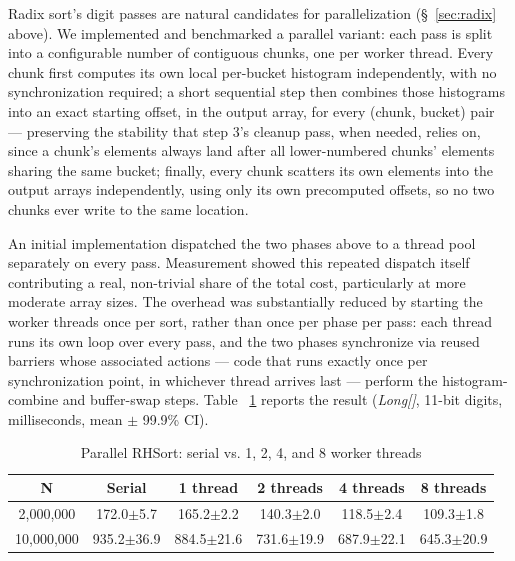 \documentclass[twoside,leqno,twocolumn]{article}
\begin{document}
Radix sort's digit passes are natural candidates for parallelization (\S~\ref{sec:radix} above).
We implemented and benchmarked a parallel variant:
each pass is split into a configurable number of contiguous chunks, one per worker thread.
Every chunk first computes its own local per-bucket histogram independently, with no synchronization required;
a short sequential step then combines those histograms into an exact starting offset, in the output array,
for every (chunk, bucket) pair — preserving the stability that step 3's cleanup pass, when needed, relies on,
since a chunk's elements always land after all lower-numbered chunks' elements sharing the same bucket;
finally, every chunk scatters its own elements into the output arrays independently,
using only its own precomputed offsets, so no two chunks ever write to the same location.

An initial implementation dispatched the two phases above to a thread pool separately on every pass.
Measurement showed this repeated dispatch itself contributing a real, non-trivial share of the total cost,
particularly at more moderate array sizes.
The overhead was substantially reduced by starting the worker threads once per sort,
rather than once per phase per pass:
each thread runs its own loop over every pass, and the two phases synchronize via reused barriers whose associated actions —
code that runs exactly once per synchronization point, in whichever thread arrives last —
perform the histogram-combine and buffer-swap steps.
Table ~\ref{tab:ParallelRadix} reports the result (\textit{Long[]}, 11-bit digits, milliseconds, mean $\pm$ 99.9\% CI).

\begin{table}
  \caption{Parallel RHSort:
serial vs. 1, 2, 4, and 8 worker threads}
  \label{tab:ParallelRadix}
  \centering
  \begin{tabular}{cccccc}
    \toprule
    N & Serial & 1 thread & 2 threads & 4 threads & 8 threads \\
    \midrule
    2,000,000 & 172.0$\pm$5.7 & 165.2$\pm$2.2 & 140.3$\pm$2.0 & 118.5$\pm$2.4 & 109.3$\pm$1.8 \\
    10,000,000 & 935.2$\pm$36.9 & 884.5$\pm$21.6 & 731.6$\pm$19.9 & 687.9$\pm$22.1 & 645.3$\pm$20.9 \\
    \bottomrule
  \end{tabular}
\end{table}
\end{document}
